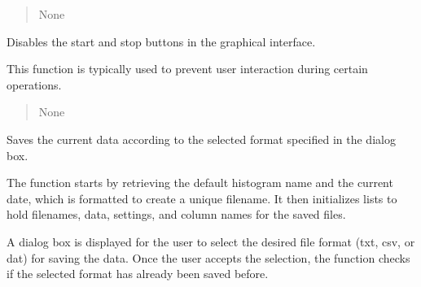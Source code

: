 \documentclass[letterpaper,10pt,english]{sphinxmanual}
\begin{document}
\begin{fulllineitems}
\begin{fulllineitems}
\begin{quote}
\begin{description}
\sphinxAtStartPar
None

\end{description}\end{quote}

\end{fulllineitems}


\begin{fulllineitems}
\label{\detokenize{StartStopHist:StartStopHist.StartStopLogic.hide_graphic2}}
\pysigstartsignatures
{}
\pysigstopsignatures
\sphinxAtStartPar
Disables the start and stop buttons in the graphical interface.

\sphinxAtStartPar
This function is typically used to prevent user interaction during certain operations.
\begin{quote}\begin{description}
\sphinxAtStartPar
None

\end{description}\end{quote}

\end{fulllineitems}


\begin{fulllineitems}
\label{\detokenize{StartStopHist:StartStopHist.StartStopLogic.save_graphic}}
\pysigstartsignatures
{}
\pysigstopsignatures
\sphinxAtStartPar
Saves the current data according to the selected format specified in the dialog box.

\sphinxAtStartPar
The function starts by retrieving the default histogram name and the current 
date, which is formatted to create a unique filename. It then initializes lists 
to hold filenames, data, settings, and column names for the saved files.

\sphinxAtStartPar
A dialog box is displayed for the user to select the desired file format 
(txt, csv, or dat) for saving the data. Once the user accepts the selection, 
the function checks if the selected format has already been saved before.


\end{fulllineitems}
\end{fulllineitems}
\end{document}
